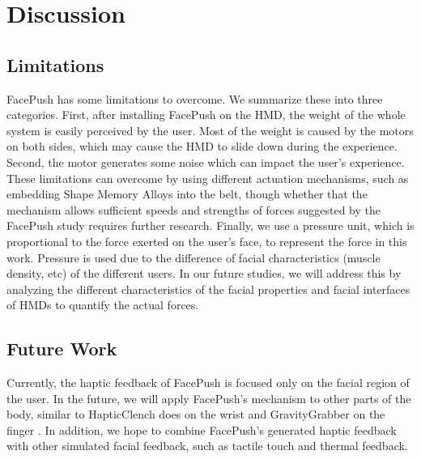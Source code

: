 \chapter{Discussion} \label{chapter:discussion}

\section{Limitations }
FacePush has some limitations to overcome. We summarize these into three categories. First, after installing FacePush on the HMD, the weight of the whole system is easily perceived by the user. Most of the weight is caused by the motors on both sides, which may cause the HMD to slide down during the experience. Second, the motor generates some noise which can impact the user's experience. These limitations can overcome by using different actuation mechanisms, such as embedding Shape Memory Alloys into the belt, though whether that the mechanism allows sufficient speeds and strengths of forces suggested by the FacePush study requires further research. Finally, we use a pressure unit, which is proportional to the force exerted on the user's face, to represent the force in this work. Pressure is used due to the difference of facial characteristics (muscle density, etc) of the different users. In our future studies, we will address this by analyzing the different characteristics of the facial properties and facial interfaces of HMDs to quantify the actual forces.

\section{Future Work }
Currently, the haptic feedback of FacePush is focused only on the facial region of the user. In the future, we will apply FacePush's mechanism to other parts of the body, similar to HapticClench does on the wrist \cite{HapticClench} and GravityGrabber on the finger \cite{Gravity.Grabber}. In addition, we hope to combine FacePush's generated haptic feedback with other simulated facial feedback, such as tactile touch and thermal feedback.
